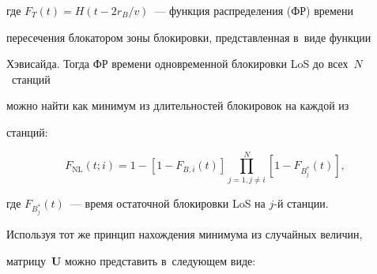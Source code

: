   \vspace*{-3pt}


  


  \noindent


  где $F_T(t)=H(t-2r_B/v)$~--- функция распределения (ФР) времени 


пересечения блокатором зоны блокировки, пред\-став\-лен\-ная в~виде функции 


Хэвисайда. Тогда ФР времени одновременной блокировки LoS до всех~$N$~станций 


можно найти как минимум из длительностей блокировок на каж\-дой из 


станций:


  \begin{equation*}


  F_{\mathrm{NL}}(t;i)=1-\left[ 1-F_{B,i}(t)\right] \prod\limits^N_{j=1, j\not=i} \left[ 1-


F_{B_j^*}(t)\right]\!,




  \end{equation*}


где $F_{B^*_j}(t)$~--- время остаточной блокировки LoS на $j$-й станции.





  Используя тот же принцип нахождения минимума из случайных величин, 


матрицу~$\mathbf{U}$ можно представить в~следующем виде:





\noindent


